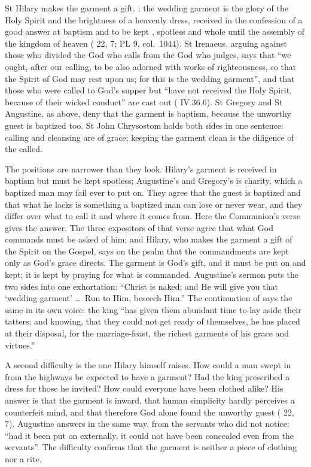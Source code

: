 St Hilary makes the garment a gift. : the wedding garment is the glory
of the Holy Spirit and the brightness of a heavenly dress, received in the
confession of a good answer at baptism and to be kept , spotless and whole until the assembly
of the kingdom of heaven ( 22, 7; PL 9,
col.~1044). St Irenaeus, arguing against those who divided the God who calls
from the God who judges, says that ``we ought, after our calling, to be also
adorned with works of righteousness, so that the Spirit of God may rest upon
us; for this is the wedding garment'', and that those who were called to God's
supper but ``have not received the Holy Spirit, because of their wicked
conduct'' are cast out ( IV.36.6). St Gregory and St
Augustine, as above, deny that the garment is baptism, because the unworthy
guest is baptized too. St John Chrysostom holds both sides in one sentence:
calling and cleansing are of grace; keeping the garment clean is the
diligence of the called.

The positions are narrower than they look. Hilary's garment is received in
baptism but must be kept spotless; Augustine's and Gregory's is charity, which a
baptized man may fail ever to put on. They agree that the guest is baptized and that
what he lacks is something a baptized man can lose or never wear, and they
differ over what to call it and where it comes from. Here the Communion's verse
gives the answer. The three expositors of that verse agree
that what God commands must be asked of him; and Hilary, who makes the garment
a gift of the Spirit on the Gospel, says on the psalm that the commandments
are kept only as God's grace directs. The garment is God's gift, and it must
be put on and kept; it is kept by praying for what is commanded. Augustine's
sermon puts the two sides into one exhortation: ``Christ is naked; and He will
give you that `wedding garment' \dots\ Run to Him, beseech Him.'' The
continuation of  says the same in its own voice: the
king ``has given them abundant time to lay aside their tatters; and knowing,
that they could not get ready of themselves, he has placed at their disposal,
for the marriage-feast, the richest garments of his grace and virtues.''

A second difficulty is the one Hilary himself raises. How could a man swept in
from the highways be expected to have a garment?  Had
the king prescribed a dress for those he invited? How could everyone have been
clothed alike? His answer is that the garment is inward, that human
simplicity hardly perceives a counterfeit mind, and that therefore God alone
found the unworthy guest ( 22, 7). Augustine
answers in the same way, from the servants who did not notice: ``had it been
put on externally, it could not have been concealed even from the servants''.
The difficulty confirms that the garment is neither a piece of clothing nor a
rite.

